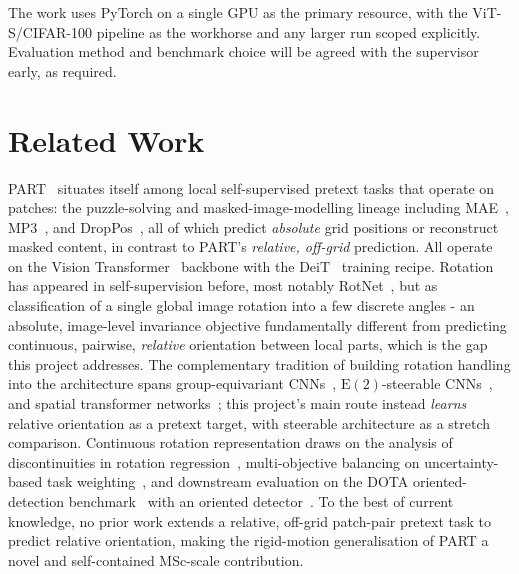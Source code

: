 \documentclass[11pt,a4paper]{article}
\begin{document}
The work uses PyTorch on a single GPU as the primary resource, with the ViT-S/CIFAR-100 pipeline as the workhorse and any larger run scoped explicitly. Evaluation method and benchmark choice will be agreed with the supervisor early, as required.

\section{Related Work}
PART~\cite{part} situates itself among local self-supervised pretext tasks that operate on patches: the puzzle-solving and masked-image-modelling lineage including MAE~\cite{mae}, MP3~\cite{mp3}, and DropPos~\cite{droppos}, all of which predict \emph{absolute} grid positions or reconstruct masked content, in contrast to PART's \emph{relative, off-grid} prediction. All operate on the Vision Transformer~\cite{vit} backbone with the DeiT~\cite{deit} training recipe. Rotation has appeared in self-supervision before, most notably RotNet~\cite{rotnet}, but as classification of a single global image rotation into a few discrete angles - an absolute, image-level invariance objective fundamentally different from predicting continuous, pairwise, \emph{relative} orientation between local parts, which is the gap this project addresses. The complementary tradition of building rotation handling into the architecture spans group-equivariant CNNs~\cite{gcnn}, $\mathrm{E}(2)$-steerable CNNs~\cite{e2cnn}, and spatial transformer networks~\cite{stn}; this project's main route instead \emph{learns} relative orientation as a pretext target, with steerable architecture as a stretch comparison. Continuous rotation representation draws on the analysis of discontinuities in rotation regression~\cite{rotcont}, multi-objective balancing on uncertainty-based task weighting~\cite{kendall}, and downstream evaluation on the DOTA oriented-detection benchmark~\cite{dota} with an oriented detector~\cite{orcnn}. To the best of current knowledge, no prior work extends a relative, off-grid patch-pair pretext task to predict relative orientation, making the rigid-motion generalisation of PART a novel and self-contained MSc-scale contribution.
\end{document}
